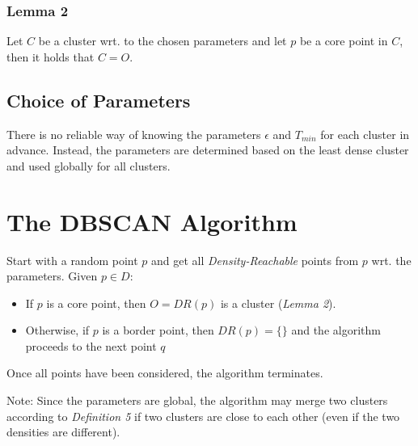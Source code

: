 \subsubsection*{Lemma 2}
Let $C$ be a cluster wrt. to the chosen parameters and let $p$ be a core point in $C$, then it holds that $C = O$.

\subsection{Choice of Parameters}
There is no reliable way of knowing the parameters $\epsilon$ and $T_{min}$ for each cluster in advance. Instead, the parameters are determined based on the least dense cluster and used globally for all clusters.

\section{The DBSCAN Algorithm}
Start with a random point $p$ and get all \textit{Density-Reachable} points from $p$ wrt. the parameters.
Given $p \in D$: 
\begin{itemize}
\item If $p$ is a core point, then $O = DR(p)$ is a cluster (\textit{Lemma 2}).
\item Otherwise, if $p$ is a border point, then $DR(p) = \{\}$ and the algorithm proceeds to the next point $q$
\end{itemize}
Once all points have been considered, the algorithm terminates. 

Note: Since the parameters are global, the algorithm may merge two clusters according to \textit{Definition 5} if two clusters are close to each other (even if the two densities are different).
